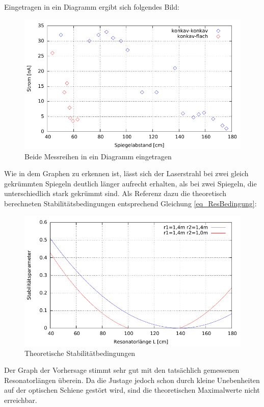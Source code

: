 Eingetragen in ein Diagramm ergibt sich folgendes Bild:
\begin{figure}[htbp]
\includegraphics[scale=1]{../gnu/Abstand.pdf}
\caption{Beide Messreihen in ein Diagramm eingetragen}
\label{gra_abstand}
\end{figure}

Wie in dem Graphen zu erkennen ist, lässt sich der Laserstrahl bei zwei gleich gekrümmten Spiegeln deutlich länger aufrecht erhalten, als bei zwei Spiegeln, die unterschiedlich stark gekrümmt sind. Als Referenz dazu die theoretisch berechneten Stabilitätsbedingungen entsprechend Gleichung \eqref{eq_ResBedingung}:
\begin{figure}[h!]
\includegraphics[scale=1]{../gnu/stabilitaetsparameter.pdf}
\caption{Theoretische Stabilitätbedingungen}
\label{gra_stabil}
\end{figure}

Der Graph der Vorhersage stimmt sehr gut mit den tatsächlich gemessenen Resonatorlängen überein. Da die Justage jedoch schon durch kleine Unebenheiten auf der optischen Schiene gestört wird, sind die theoretischen Maximalwerte nicht erreichbar.

